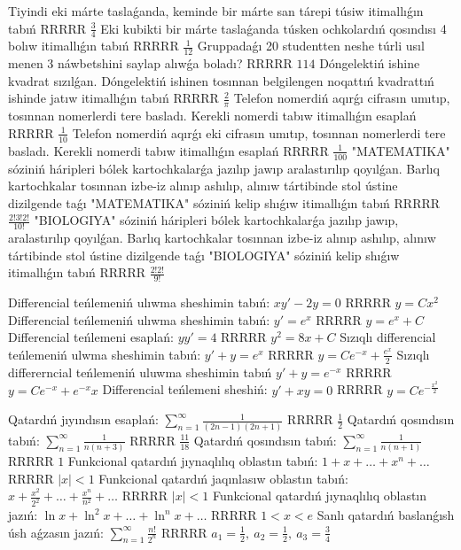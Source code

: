 Tiyindi eki márte taslaǵanda, keminde bir márte san tárepi túsiw itimallıǵın tabıń RRRRR $\frac{3}{4}$
Eki kubikti bir márte taslaǵanda túsken ochkolardıń qosındısı 4 bolıw itimallıǵın tabıń RRRRR $\frac{1}{12}$
Gruppadaǵı 20 studentten neshe túrli usıl menen 3 náwbetshini saylap alıwǵa boladı? RRRRR $114$
Dóngelektiń ishine kvadrat sızılǵan. Dóngelektiń ishinen tosınnan belgilengen noqattıń kvadrattıń ishinde jatıw itimallıǵın tabıń RRRRR $\frac{2}{\pi}$
Telefon nomerdiń aqırǵı cifrasın umıtıp, tosınnan nomerlerdi tere basladı. Kerekli nomerdi tabıw itimallıǵın esaplań RRRRR $\frac{1}{10}$
Telefon nomerdiń aqırǵı eki cifrasın umıtıp, tosınnan nomerlerdi tere basladı. Kerekli nomerdi tabıw itimallıǵın esaplań RRRRR $\frac{1}{100}$
"MATEMATIKA" sóziniń háripleri bólek kartochkalarǵa jazılıp jawıp aralastırılıp qoyılǵan. Barlıq kartochkalar tosınnan izbe-iz alınıp ashılıp, alınıw tártibinde stol ústine dizilgende taǵı "MATEMATIKA" sóziniń kelip shıǵıw itimallıǵın tabıń RRRRR $\frac{2!3!2!}{10!}$
"BIOLOGIYA" sóziniń háripleri bólek kartochkalarǵa jazılıp jawıp, aralastırılıp qoyılǵan. Barlıq kartochkalar tosınnan izbe-iz alınıp ashılıp, alınıw tártibinde stol ústine dizilgende taǵı "BIOLOGIYA" sóziniń kelip shıǵıw itimallıǵın tabıń RRRRR $\frac{2!2!}{9!}$

Differencial teńlemeniń ulıwma sheshimin tabıń: $xy' - 2y = 0$ RRRRR $y=Cx^2$
Differencial teńlemeniń ulıwma sheshimin tabıń: $y'=e^{x}$ RRRRR $y=e^x+C$
Differencial teńlemeni esaplań: $yy'= 4$ RRRRR $y^2=8x+C$
Sızıqlı differencial teńlemeniń ulwma sheshimin tabıń: $y' + y =e^{x}$ RRRRR $y=Ce^{-x}+\frac{e^x}{2}$
Sızıqlı differerncial teńlemeniń uluwma sheshimin tabıń $y' + y =e^{-x}$ RRRRR $y=Ce^{-x}+e^{-x}x$
Differencial teńlemeni sheshiń: $y' + xy = 0$ RRRRR $y=Ce^{-\frac{x^2}{2}}$

Qatardıń jıyındısın esaplań: $\displaystyle\sum_{n = 1}^{\infty}\frac{1}{(2n - 1)(2n + 1)}$ RRRRR $\frac{1}{2}$
Qatardıń qosındısın tabıń: $\displaystyle\sum_{n = 1}^{\infty}\frac{1}{n(n + 3)}$ RRRRR $\frac{11}{18}$
Qatardıń qosındısın tabıń: $\displaystyle\sum_{n = 1}^{\infty}\frac{1}{n(n + 1)}$ RRRRR $1$
Funkcional qatardıń jıynaqlılıq oblastın tabıń: $1 + x + \ldots + x^{n} + \ldots$ RRRRR $|x|<1$
Funkcional qatardıń jaqınlasıw oblastın tabıń: $\displaystyle x + \frac{x^{2}}{2^{2}} + \ldots + \frac{x^{n}}{n^{2}} + \ldots$ RRRRR $|x|<1$
Funkcional qatardıń jıynaqlılıq oblastın jazıń: $\ln x + \ln^{2}x + \ldots + \ln^{n}x + \ldots$ RRRRR $1\lt x\lt e$
Sanlı qatardıń baslanǵısh úsh aǵzasın jazıń: $\displaystyle\sum_{n = 1}^{\infty}\frac{n!}{2^{n}}$ RRRRR $a_1=\frac{1}{2},\ a_2=\frac{1}{2},\ a_3=\frac{3}{4}$